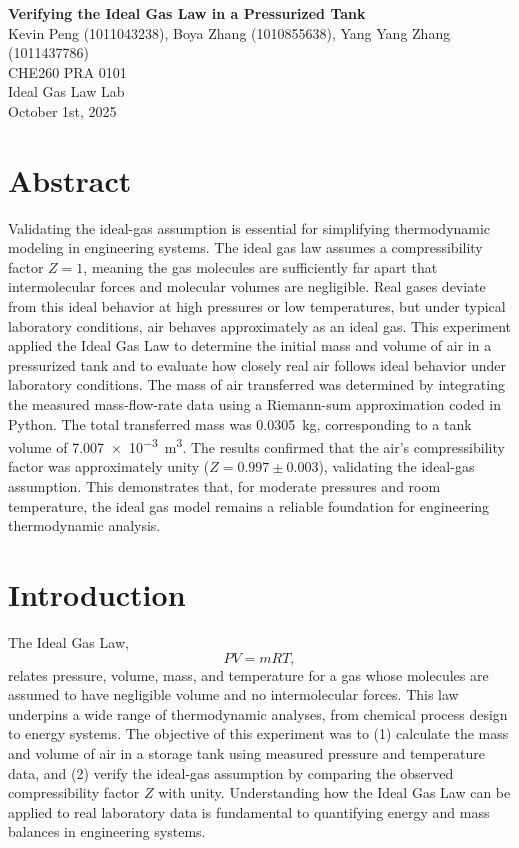 \documentclass[12pt]{article}
\begin{document}
\begin{center}
\textbf{\Large Verifying the Ideal Gas Law in a Pressurized Tank} \\[0.5em]
Kevin Peng (1011043238), Boya Zhang (1010855638), Yang Yang Zhang (1011437786)\\[0.5em]
CHE260 PRA 0101 \\
Ideal Gas Law Lab \\
October 1st, 2025 \\
\end{center}

\section*{Abstract}
Validating the ideal-gas assumption is essential for simplifying thermodynamic modeling in engineering systems. The ideal gas law assumes a compressibility factor \(Z = 1\), meaning the gas molecules are sufficiently far apart that intermolecular forces and molecular volumes are negligible. Real gases deviate from this ideal behavior at high pressures or low temperatures, but under typical laboratory conditions, air behaves approximately as an ideal gas. 
This experiment applied the Ideal Gas Law to determine the initial mass and volume of air in a pressurized tank and to evaluate how closely real air follows ideal behavior under laboratory conditions. The mass of air transferred was determined by integrating the measured mass-flow-rate data using a Riemann-sum approximation coded in Python. The total transferred mass was \SI{0.0305}{\kilogram}, corresponding to a tank volume of \SI{7.007e-3}{\metre\cubed}. The results confirmed that the air’s compressibility factor was approximately unity (\(Z = 0.997 \pm 0.003\)), validating the ideal-gas assumption. This demonstrates that, for moderate pressures and room temperature, the ideal gas model remains a reliable foundation for engineering thermodynamic analysis.

\section*{Introduction}
The Ideal Gas Law,
\[
PV = m R T,
\]
relates pressure, volume, mass, and temperature for a gas whose molecules are assumed to have negligible volume and no intermolecular forces. This law underpins a wide range of thermodynamic analyses, from chemical process design to energy systems. The objective of this experiment was to (1) calculate the mass and volume of air in a storage tank using measured pressure and temperature data, and (2) verify the ideal-gas assumption by comparing the observed compressibility factor \(Z\) with unity. Understanding how the Ideal Gas Law can be applied to real laboratory data is fundamental to quantifying energy and mass balances in engineering systems.
\end{document}
